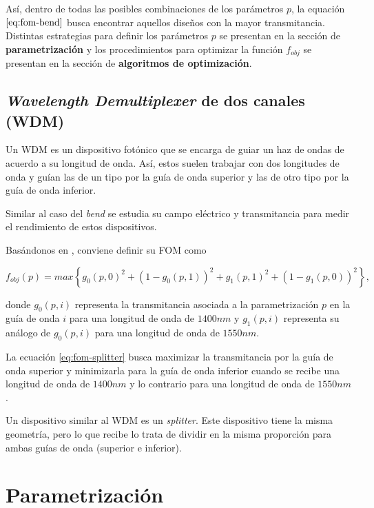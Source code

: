 Así, dentro de todas las posibles combinaciones de los parámetros $p$, la
equación $\ref{eq:fom-bend}$ busca encontrar aquellos diseños con la mayor transmitancia.
Distintas estrategias para definir los parámetros $p$ se presentan en la
sección de \textbf{parametrización} y 
los procedimientos para optimizar la función $f_{obj}$ se presentan en la
sección de \textbf{algoritmos de optimización}.

\subsection{\emph{Wavelength Demultiplexer} de dos canales (WDM)}

Un WDM es un dispositivo fotónico que se encarga de guiar un haz de ondas de acuerdo a su longitud de onda.
Así, estos suelen trabajar con dos longitudes de onda y guían las de un tipo por la guía de onda superior y las de otro tipo por la guía de onda inferior.

Similar al caso del \emph{bend} se estudia su campo eléctrico y transmitancia para medir el rendimiento de estos dispositivos.

Basándonos en \cite{Su2020}, conviene definir su FOM como

\begin{equation}
  f_{obj}(p) = max \left \{ g_0(p, 0)^2 + (1 - g_0(p, 1))^2 + g_1(p, 1)^2 + (1
  - g_1(p, 0))^2 \right \},
\label{eq:fom-splitter}
\end{equation}

donde $g_0(p, i)$ representa la transmitancia asociada a la parametrización $p$ en la guía de onda $i$ para una longitud de onda de $1400 nm$ y 
      $g_1(p, i)$ representa su análogo de $g_0(p, i)$ para una longitud de onda de $1550 nm$.

La ecuación \ref{eq:fom-splitter} busca maximizar la transmitancia por la guía de onda superior y minimizarla para la guía de onda inferior cuando se recibe una longitud de onda de $1400 nm$ y lo contrario para una longitud de onda de $1550 nm$.

Un dispositivo similar al WDM es un \emph{splitter}. Este dispositivo tiene la
misma geometría, pero lo que recibe lo trata de dividir en la misma proporción
para ambas guías de onda (superior e inferior).

\section{Parametrización}

